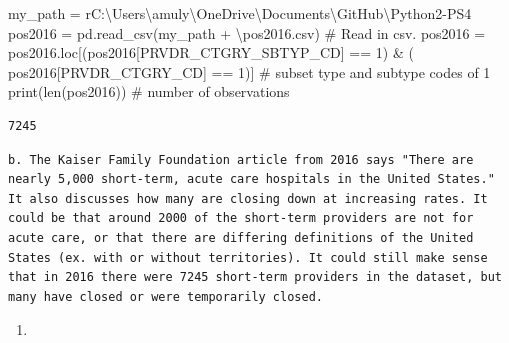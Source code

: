 \documentclass[
  letterpaper,
  DIV=11,
  numbers=noendperiod]{scrartcl}
\newenvironment{Shaded}{\begin{snugshade}}{\end{snugshade}}
\newcommand{\BuiltInTok}[1]{\textcolor[rgb]{0.00,0.23,0.31}{#1}}
\newcommand{\CommentTok}[1]{\textcolor[rgb]{0.37,0.37,0.37}{#1}}
\newcommand{\DecValTok}[1]{\textcolor[rgb]{0.68,0.00,0.00}{#1}}
\newcommand{\NormalTok}[1]{\textcolor[rgb]{0.00,0.23,0.31}{#1}}
\newcommand{\OperatorTok}[1]{\textcolor[rgb]{0.37,0.37,0.37}{#1}}
\newcommand{\StringTok}[1]{\textcolor[rgb]{0.13,0.47,0.30}{#1}}
\newcommand{\VerbatimStringTok}[1]{\textcolor[rgb]{0.13,0.47,0.30}{#1}}
\providecommand{\tightlist}{%
  \setlength{\itemsep}{0pt}\setlength{\parskip}{0pt}}\usepackage{longtable,booktabs,array}
\begin{document}
\begin{Shaded}
\begin{Highlighting}[]
\NormalTok{my\_path }\OperatorTok{=} \VerbatimStringTok{r\textquotesingle{}C:\textbackslash{}Users\textbackslash{}amuly\textbackslash{}OneDrive\textbackslash{}Documents\textbackslash{}GitHub\textbackslash{}Python2{-}PS4\textquotesingle{}}
\NormalTok{pos2016 }\OperatorTok{=}\NormalTok{ pd.read\_csv(my\_path }\OperatorTok{+} \StringTok{\textquotesingle{}\textbackslash{}pos2016.csv\textquotesingle{}}\NormalTok{)  }\CommentTok{\# Read in csv.}
\NormalTok{pos2016 }\OperatorTok{=}\NormalTok{ pos2016.loc[(pos2016[}\StringTok{\textquotesingle{}PRVDR\_CTGRY\_SBTYP\_CD\textquotesingle{}}\NormalTok{] }\OperatorTok{==} \DecValTok{1}\NormalTok{) }\OperatorTok{\&}\NormalTok{ (}
\NormalTok{    pos2016[}\StringTok{\textquotesingle{}PRVDR\_CTGRY\_CD\textquotesingle{}}\NormalTok{] }\OperatorTok{==} \DecValTok{1}\NormalTok{)]  }\CommentTok{\# subset type and subtype codes of 1}
\BuiltInTok{print}\NormalTok{(}\BuiltInTok{len}\NormalTok{(pos2016))  }\CommentTok{\# number of observations}
\end{Highlighting}
\end{Shaded}

\begin{verbatim}
7245
\end{verbatim}

\begin{verbatim}
b. The Kaiser Family Foundation article from 2016 says "There are nearly 5,000 short-term, acute care hospitals in the United States." It also discusses how many are closing down at increasing rates. It could be that around 2000 of the short-term providers are not for acute care, or that there are differing definitions of the United States (ex. with or without territories). It could still make sense that in 2016 there were 7245 short-term providers in the dataset, but many have closed or were temporarily closed. 
\end{verbatim}

\begin{enumerate}
\def\labelenumi{\arabic{enumi}.}
\setcounter{enumi}{2}
\tightlist
\item
\end{enumerate}
\end{document}
